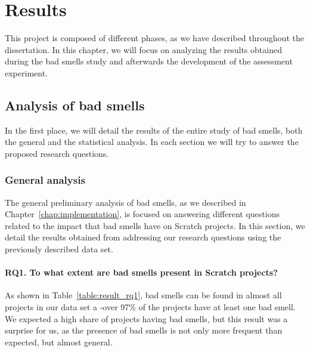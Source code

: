 

\cleardoublepage
\chapter{Results}
\label{chap:results}

This project is composed of different phases, as we have described throughout the dissertation. In this chapter, we will focus on analyzing the results obtained during the bad smells study and afterwards the development of the assessment experiment.

\section{Analysis of bad smells}
\label{sec:results_analysis}

In the first place, we will detail the results of the entire study of bad smells, both the general and the statistical analysis. In each section we will try to answer the proposed research questions.  

\subsection{General analysis}
\label{subsec:results_general}

The general preliminary analysis of bad smells, as we described in Chapter~\ref{chap:implementation}, is focused on answering different questions related to the impact that bad smells have on Scratch projects. In this section, we detail the results obtained from addressing our research questions using the previously described data set. 

\subsubsection{RQ1. To what extent are bad smells present in Scratch projects?}
\label{subsubsec:rq1_results}

As shown in Table~\ref{table:result_rq1}, bad smells can be found in almost all projects in our data set a -over 97\% of the projects have at least one bad smell. We expected a high share of projects having bad smells, but this result was a surprise for us, as the presence of bad smells is not only more frequent than expected, but almost general.

